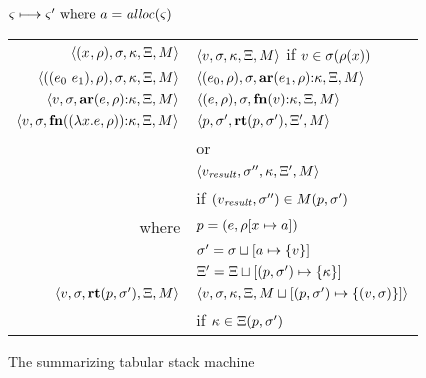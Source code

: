 \begin{figure}
  \centering
  $\varsigma \longmapsto \varsigma' \text{ where } a = \mathit{alloc}(\varsigma)$ \\
  \begin{tabular}{r|l}
    \hline
    $\langle (x^{{}}, \rho), \sigma, \kappa, \Xi, M \rangle$
    &
    $\langle v,\sigma,\kappa, \Xi, M \rangle$ if $v \in \sigma(\rho(x))$
    \\
    $\langle ((e_{0}\ e_{1}){}, \rho), \sigma, \kappa, \Xi, M \rangle$
    &
    $\langle (e_{0}, \rho), \sigma, \mathbf{ar}{}(e_{1},\rho){\tt :} \kappa, \Xi, M \rangle$
    \\
    $\langle v, \sigma, \mathbf{ar}{}(e,\rho){\tt :} \kappa, \Xi, M \rangle$
    &
    $\langle (e, \rho), \sigma, \mathbf{fn}{}(v){\tt :} \kappa, \Xi, M \rangle$
    \\
    $\langle v,\sigma,\mathbf{fn}{}((\lambda{} x. e, \rho)){\tt :} \kappa,\Xi,M \rangle$
    & %
    $\langle p,
          \sigma',
          \mathbf{rt}(p, \sigma'),
          \Xi',
          M \rangle$
\\
    & or \\
    & $\langle v_\mathit{result},
            \sigma'',
            \kappa,
            \Xi',
            M \rangle$
    \\ & \quad if $(v_\mathit{result},\sigma'') \in M(p,\sigma')$
    \\ %
    where & $p = (e, \rho[x \mapsto a])$ \\
          & $\sigma' = \sigma\sqcup[a \mapsto \{ v \}]$ \\
          & $\Xi' = \Xi\sqcup[(p, \sigma') \mapsto \{ \kappa \}]$
    \\
    $\langle v, \sigma, \mathbf{rt}(p,\sigma'), \Xi, M \rangle$
    &
    $\langle v, \sigma, \kappa, \Xi, M\sqcup[(p, \sigma') \mapsto \{ (v,\sigma) \}] \rangle$
    \\ & \quad if $\kappa \in \Xi(p, \sigma')$
  \end{tabular}
  \caption{The summarizing tabular stack machine}
  \label{fig:summary-semantics}
\end{figure}


